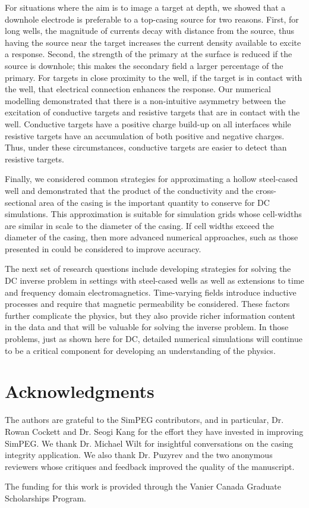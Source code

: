 \documentclass[extra,mreferee]{gji}
\begin{document}
For situations where the aim is to image a target at depth, we showed that a downhole electrode is preferable to a top-casing source for two reasons. First, for long wells, the magnitude of currents decay with distance from the source, thus having the source near the target increases the current density available to excite a response. Second, the strength of the primary at the surface is reduced if the source is downhole; this makes the secondary field a larger percentage of the primary.   For targets in close proximity to the well, if the target is in contact with the well, that electrical connection enhances the response. Our numerical modelling demonstrated that there is a non-intuitive asymmetry between the excitation of conductive targets and resistive targets that are in contact with the well. Conductive targets have a positive charge build-up on all interfaces while resistive targets have an accumulation of both positive and negative charges. Thus, under these circumstances, conductive targets are easier to detect than resistive targets.

Finally, we considered common strategies for approximating a hollow steel-cased well and demonstrated that the product of the conductivity and the cross-sectional area of the casing is the important quantity to conserve for DC simulations. This approximation is suitable for simulation grids whose cell-widths are similar in scale to the diameter of the casing. If cell widths exceed the diameter of the casing, then more advanced numerical approaches, such as those presented in \cite{Weiss2017, Caudillo-Mata2017a} could be considered to improve accuracy.

The next set of research questions include developing strategies for solving the DC inverse problem in settings with steel-cased wells as well as extensions to time and frequency domain electromagnetics. Time-varying fields introduce inductive processes and require that magnetic permeability be considered. These factors further complicate the physics, but they also provide richer information content in the data and that will be  valuable for solving the inverse problem. In those problems, just as shown here for DC, detailed numerical simulations will continue to be a critical component for developing an understanding of the physics.


\section*{Acknowledgments}

The authors are grateful to the SimPEG contributors, and in particular, Dr. Rowan Cockett and Dr. Seogi Kang for the effort they have invested in improving SimPEG. We thank Dr. Michael Wilt for insightful conversations on the casing integrity application. We also thank Dr. Puzyrev and the two anonymous reviewers whose critiques and feedback improved the quality of the manuscript.

The funding for this work is provided through the Vanier Canada Graduate Scholarships Program.





\clearpage
\end{document}
